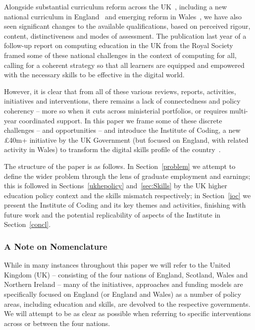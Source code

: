 \documentclass[sigconf,anonymous]{acmart}
\begin{document}
Alongside substantial curriculum reform across the
UK~\cite{brown-et-al:sigcse2013,brown-et-al:toce2014},
including a new national curriculum in England~\cite{DfE2013a} and
emerging reform in
Wales~\cite{wgictreview:2013,moller+crick:jce2018},
we have also seen significant changes to the available qualifications,
based on perceived rigour, content, distinctiveness and modes of
assessment. The publication last year of a follow-up report on
computing education in the UK from the Royal Society~\cite{rs:2017}
framed some of these national challenges in the context of computing
for all, calling for a coherent strategy so that all learners are
equipped and empowered with the necessary skills to be effective in
the digital world.

However, it is clear that from all of these various reviews, reports,
activities, initiatives and interventions, there remains a lack of
connectedness and policy coherency -- more so when it cuts across
ministerial portfolios, or requires multi-year coordinated support. In
this paper we frame some of these discrete challenges -- and
opportunities -- and introduce the Institute of Coding, a new
\pounds40m+ initiative by the UK Government (but focused on
England, with related activity in Wales) to transform the digital
skills profile of the country~\cite{davenport-et-al:cep2019}.

The structure of the paper is as follows. In Section~\ref{problem} we
attempt to define the wider problem through the lens of graduate
employment and earnings; this is followed in Sections~\ref{ukhepolicy}
and~\ref{sec:Skills} by the UK higher education policy context and the
skills mismatch respectively; in Section~\ref{ioc} we present the
Institute of Coding and its key themes and activities, finishing with
future work and the potential replicability of aspects of
the Institute in Section~\ref{concl}.


\subsubsection*{A Note on Nomenclature}

While in many instances throughout this paper we will refer to the
United Kingdom (UK) -- consisting of the four nations of England,
Scotland, Wales and Northern Ireland -- many of the %
initiatives, approaches and funding models are specifically focused on
England (or England and Wales) as a number of policy areas,
including education and skills, are devolved to the respective
governments. We will attempt to be as clear as possible when referring
to specific interventions across or between the four nations.
\end{document}
